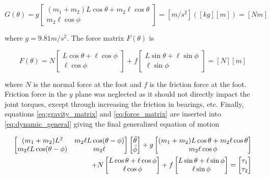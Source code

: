 \begin{equation} \label{eq:gravity_matrix}
    G(\theta) = g \begin{bmatrix}
        (m_1 + m_2) L \cos\theta + m_2 \ell \cos\theta \\
        m_2 \ell \cos\phi
    \end{bmatrix}
    = [m/s^2]([kg][m]) = [Nm]
\end{equation}

where $g = 9.81 m/s^2$.
The force matrix $F(\theta)$ is

\begin{equation} \label{eq:force_matrix}
    F(\theta) = N \begin{bmatrix}
        L\cos\theta + \ell\cos\phi \\
        \ell\cos\phi
    \end{bmatrix} + f \begin{bmatrix}
        L\sin\theta + \ell\sin\phi \\
        \ell\sin\phi
    \end{bmatrix}
    = [N][m]
\end{equation}

where $N$ is the normal force at the foot and $f$ is the friction force at the foot.
Friction force in the $y$ plane was neglected as it should not directly impact the joint torques, except through increasing the friction in bearings, etc.
Finally, equations \ref{eq:gravity_matrix} and \ref{eq:force_matrix} are inserted into \ref{eq:dynamic_general} giving the final generalized equation of motion

\begin{equation} \label{eq:dynamic_equation_app}
    \begin{split}
        \begin{bmatrix} 
            (m_1 + m_2) L^2 & m_2 \ell L \cos(\theta-\phi) \\
            m_2 \ell L \cos(\theta-\phi) & m_2 \ell
        \end{bmatrix}
        \begin{bmatrix} \Ddot{\theta} \\ \Ddot{\phi} \end{bmatrix}
        +
        g \begin{bmatrix}
            (m_1 + m_2) L \cos\theta + m_2 \ell \cos\theta \\
            m_2 \ell \cos\phi
        \end{bmatrix} \\
        +
        N \begin{bmatrix}
            L\cos\theta + \ell\cos\phi \\
            \ell\cos\phi
            \end{bmatrix} + f \begin{bmatrix}
            L\sin\theta + \ell\sin\phi \\
            \ell\sin\phi
        \end{bmatrix}
        =
        \begin{bmatrix}
        \tau_1 \\ \tau_2
        \end{bmatrix}
    \end{split}
\end{equation}

